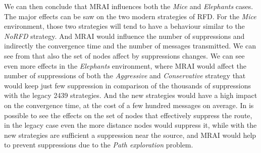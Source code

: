 We can then conclude that \ac{MRAI} influences both the \textit{Mice} and
\textit{Elephants} cases.
The major effects can be saw on the two modern strategies of \ac{RFD}.
For the \textit{Mice} environment, those two strategies will tend to have
a behaviour similar to the \textit{NoRFD} strategy. And \ac{MRAI} would
influence the number of suppressions and indirectly the convergence time
and the number of messages transmitted.
We can see from  that also the set of
nodes affect by suppressions changes.
We can see even more effects in the \textit{Elephants} environment, where
\ac{MRAI} would affect the number of suppressions of both the \textit{Aggressive}
and \textit{Conservative} strategy that would keep just few suppression in
comparison of the thousands of suppressions with the legacy \num{2439} strategies.
And the new strategies would have a high impact on the convergence time, at
the cost of a few hundred messages on average.
In  is possible to see the effects
on the set of nodes that effectively suppress the route, in the legacy
case even the more distance nodes would suppress it, while with the new
strategies are sufficient a suppression near the source, and \ac{MRAI} would
help to prevent suppressions due to the \textit{Path exploration} problem.

